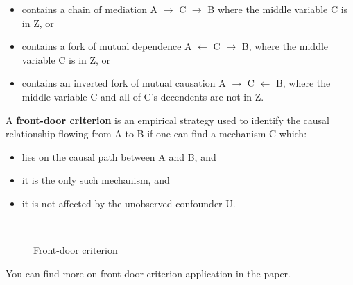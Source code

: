 \begin{itemize}

\item contains a chain of mediation A $\rightarrow$ C $\rightarrow$  B where the middle variable C is in Z, or

\item contains a fork of mutual dependence A $\leftarrow$ C $\rightarrow$ B, where the middle variable C is in Z, or

\item contains an inverted fork of mutual causation A $\rightarrow$ C $\leftarrow$  B, where the middle variable C and all of C's decendents are not in Z.

\end{itemize}

A \textbf{front-door criterion} is an empirical strategy used to identify the causal relationship flowing from A to B if one can find a mechanism C which:

\begin{itemize}

\item  lies on the causal path between A and B, and 

\item it is the only such mechanism, and 

\item it is not affected by the unobserved confounder U.

\end{itemize}

\begin{figure}[htp]\centering
\caption{Front-door criterion}\
\end{figure}


You can find more on front-door criterion application in the \cite{Bellemare.2020} paper.

\nocite{Morgan.2014}
\nocite{Pearl.2009}





